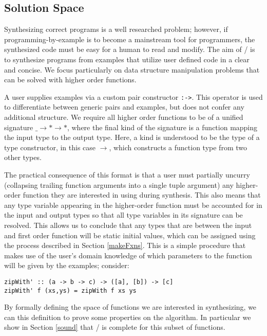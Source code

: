 %

\subsection{Solution Space}\label{solnSpace}
Synthesizing correct programs is a well researched problem; however, if programming-by-example is to become a mainstream tool for programmers, the synthesized code must be easy for a human to read and modify.
The aim of \ourTool/ is to synthesize programs from examples that utilize user defined code in a clear and concise.
We focus particularly on data structure manipulation problems that can be solved with higher order functions.


A user supplies examples via a custom pair constructor \texttt{:->}. This operator is used to differentiate between generic pairs and examples, but does not confer any additional structure. We require all higher order functions to be of a unified signature \texttt{$\_ \to * \to *$}, where the final kind of the signature is a function mapping the input type to the output type. Here, a kind is understood to be the type of a type constructor, in this case \texttt{$\to$}, which constructs a function type from two other types.

The practical consequence of this format is that a user must partially uncurry (collapsing trailing function arguments into a single tuple argument) any higher-order function they are interested in using during synthesis.
This also means that any type variable appearing in the higher-order function must be accounted for in the input and output types so that all type variables in its signature can be resolved.
This allows us to conclude that any types that are between the input and first order function will be static initial values, which can be assigned using the process described in Section \ref{makeFxns}.
This is a simple procedure that makes use of the user's domain knowledge of which parameters to the function will be given by the examples; consider:

\begin{lstlisting}
zipWith' :: (a -> b -> c) -> ([a], [b]) -> [c]
zipWith' f (xs,ys) = zipWith f xs ys
\end{lstlisting}

By formally defining the space of functions we are interested in synthesizing, we can this definition to prove some properties on the algorithm.
In particular we show in Section \ref{sound} that \ourTool/ is complete for this subset of functions.

